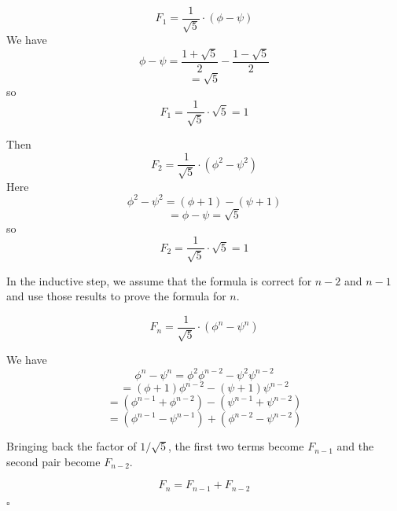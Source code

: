 \documentclass[11pt, oneside]{article}
\begin{document}
\[ F_1 =  \frac{1}{\sqrt{5}} \cdot  (\phi - \psi) \]
We have
\[ \phi - \psi = \frac{1 + \sqrt{5}}{2} - \frac{1 - \sqrt{5}}{2} \]
\[ = \sqrt{5} \]
so
\[ F_1 = \frac{1}{\sqrt{5}} \cdot \sqrt{5} = 1 \]

Then
\[ F_2 = \frac{1}{\sqrt{5}} \cdot  (\phi^2 - \psi^2) \]
Here
\[ \phi^2 - \psi^2 = (\phi+1) - (\psi + 1) \]
\[ = \phi - \psi = \sqrt{5} \]
so
\[ F_2 = \frac{1}{\sqrt{5}} \cdot \sqrt{5} = 1 \]

In the inductive step, we assume that the formula is correct for $n-2$ and $n-1$ and use those results to prove the formula for $n$.

\[ F_n = \frac{1}{\sqrt{5}} \cdot  (\phi^n - \psi^n) \]

We have
\[ \phi^n - \psi^n = \phi^2 \phi^{n-2} - \psi^2 \psi^{n-2} \]
\[ = (\phi + 1) \phi^{n-2} - (\psi + 1) \psi^{n-2} \]
\[ = (\phi^{n-1} + \phi^{n-2}) - (\psi^{n-1} + \psi^{n-2}) \]
\[ = (\phi^{n-1} - \psi^{n-1}) + (\phi^{n-2} - \psi^{n-2}) \]

Bringing back the factor of $1/\sqrt{5}$, the first two terms become $F_{n-1}$ and the second pair become $F_{n-2}$.

\[ F_n = F_{n-1} + F_{n-2} \]

$\square$
\end{document}
